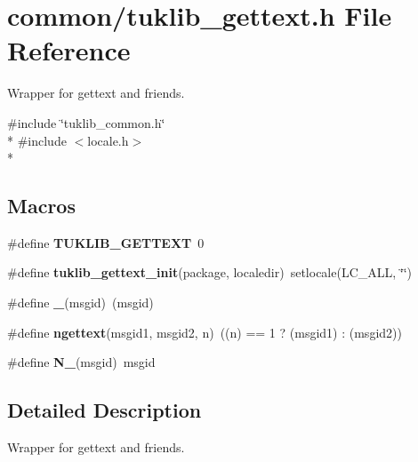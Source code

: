 \section{common/tuklib\-\_\-gettext.h File Reference}
\label{tuklib__gettext_8h}


Wrapper for gettext and friends.  


{\ttfamily \#include \char`\"{}tuklib\-\_\-common.\-h\char`\"{}}\\*
{\ttfamily \#include $<$locale.\-h$>$}\\*
\subsection*{Macros}
\begin{DoxyCompactItemize}
\item 
\#define {\bfseries T\-U\-K\-L\-I\-B\-\_\-\-G\-E\-T\-T\-E\-X\-T}~0\label{tuklib__gettext_8h_ad23ab054473fd40860e25119a2ea9544}

\item 
\#define {\bfseries tuklib\-\_\-gettext\-\_\-init}(package, localedir)~setlocale(L\-C\-\_\-\-A\-L\-L, \char`\"{}\char`\"{})\label{tuklib__gettext_8h_ae51f4118b9bd93c4df9606a63121f4f8}

\item 
\#define {\bfseries \-\_\-}(msgid)~(msgid)\label{tuklib__gettext_8h_a86a239addea586602343007a370bf8ad}

\item 
\#define {\bfseries ngettext}(msgid1, msgid2, n)~((n) == 1 ? (msgid1) \-: (msgid2))\label{tuklib__gettext_8h_a1db71b632cea57d33a14bafc237c6a70}

\item 
\#define {\bfseries N\-\_\-}(msgid)~msgid\label{tuklib__gettext_8h_abdf0847bd8caa2c2247f5d9bc5e12982}

\end{DoxyCompactItemize}


\subsection{Detailed Description}
Wrapper for gettext and friends. 